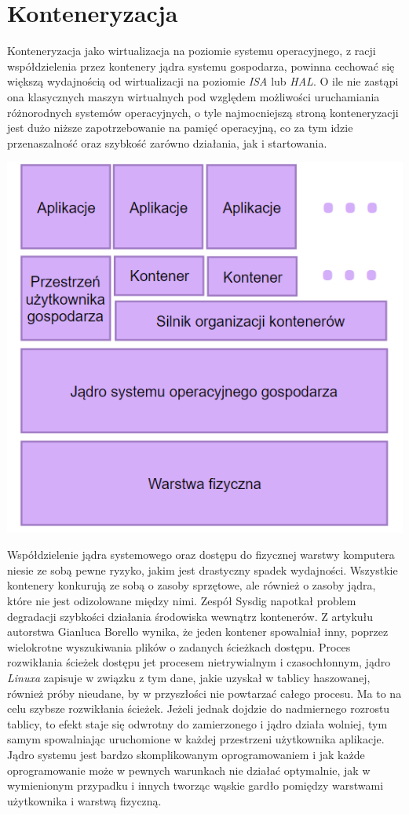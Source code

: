 \documentclass[polish, a4paper, 12pt, oneside]{book}
\begin{document}
	\section{Konteneryzacja}
	Konteneryzacja jako wirtualizacja na poziomie systemu operacyjnego, z racji współdzielenia przez kontenery jądra systemu gospodarza, powinna cechować się większą wydajnością od wirtualizacji na poziomie \textit{ISA} lub \textit{HAL}. O ile nie zastąpi ona klasycznych maszyn wirtualnych pod względem możliwości uruchamiania różnorodnych systemów operacyjnych, o tyle najmocniejszą stroną konteneryzacji jest dużo niższe zapotrzebowanie na pamięć operacyjną, co za tym idzie przenaszalność oraz szybkość zarówno działania, jak i startowania. 
	\begin{center}
		\includegraphics[width=140mm]{schemat_kont.png}
	\end{center}
	Współdzielenie jądra systemowego oraz dostępu do fizycznej warstwy komputera niesie ze sobą pewne ryzyko, jakim jest drastyczny spadek wydajności. Wszystkie kontenery konkurują ze sobą o zasoby sprzętowe, ale również o zasoby jądra, które nie jest odizolowane między nimi. Zespół Sysdig napotkał problem degradacji szybkości działania środowiska wewnątrz kontenerów. Z artykułu autorstwa Gianluca Borello\cite{sd17} wynika, że jeden kontener spowalniał inny, poprzez wielokrotne wyszukiwania plików o zadanych ścieżkach dostępu. Proces rozwikłania ścieżek dostępu jet procesem nietrywialnym i czasochłonnym, jądro \textit{Linuxa} zapisuje w związku z tym dane, jakie uzyskał w tablicy haszowanej, również próby nieudane, by w przyszłości nie powtarzać całego procesu. Ma to na celu szybsze rozwikłania ścieżek. Jeżeli jednak dojdzie do nadmiernego rozrostu tablicy, to efekt staje się odwrotny do zamierzonego i jądro działa wolniej, tym samym spowalniając uruchomione w każdej przestrzeni użytkownika aplikacje. Jądro systemu jest bardzo skomplikowanym oprogramowaniem i jak każde oprogramowanie może w pewnych warunkach nie działać optymalnie, jak w wymienionym przypadku i innych tworząc wąskie gardło pomiędzy warstwami użytkownika i warstwą fizyczną.
	
\end{document}
